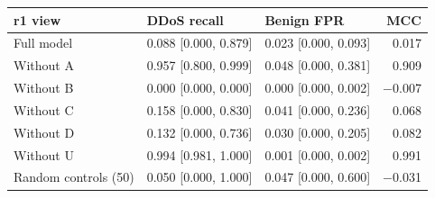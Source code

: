 \begin{tabular}{@{}lllr@{}}
\toprule
r1 view & DDoS recall & Benign FPR & MCC \\
\midrule
Full model & 0.088 [0.000, 0.879] & 0.023 [0.000, 0.093] & 0.017 \\
Without A & 0.957 [0.800, 0.999] & 0.048 [0.000, 0.381] & 0.909 \\
Without B & 0.000 [0.000, 0.000] & 0.000 [0.000, 0.002] & $-$0.007 \\
Without C & 0.158 [0.000, 0.830] & 0.041 [0.000, 0.236] & 0.068 \\
Without D & 0.132 [0.000, 0.736] & 0.030 [0.000, 0.205] & 0.082 \\
Without U & 0.994 [0.981, 1.000] & 0.001 [0.000, 0.002] & 0.991 \\
Random controls (50) & 0.050 [0.000, 1.000] & 0.047 [0.000, 0.600] & $-$0.031 \\
\bottomrule
\end{tabular}
